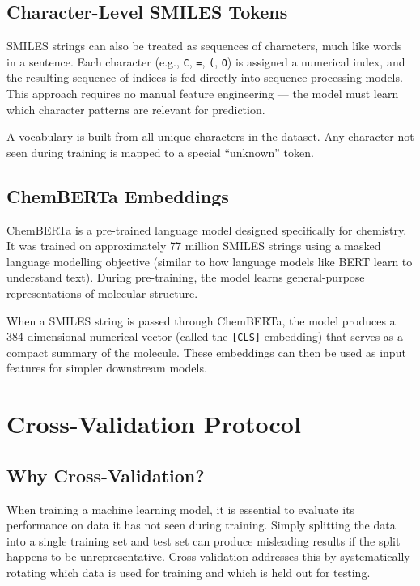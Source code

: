 \documentclass[11pt,a4paper]{article}
\begin{document}
\subsection{Character-Level SMILES Tokens}

SMILES strings can also be treated as sequences of characters, much like words in a sentence. Each character (e.g., \texttt{C}, \texttt{=}, \texttt{(}, \texttt{O}) is assigned a numerical index, and the resulting sequence of indices is fed directly into sequence-processing models. This approach requires no manual feature engineering --- the model must learn which character patterns are relevant for prediction.

A vocabulary is built from all unique characters in the dataset. Any character not seen during training is mapped to a special ``unknown'' token.

\subsection{ChemBERTa Embeddings}

ChemBERTa is a pre-trained language model designed specifically for chemistry. It was trained on approximately 77 million SMILES strings using a masked language modelling objective (similar to how language models like BERT learn to understand text). During pre-training, the model learns general-purpose representations of molecular structure.

When a SMILES string is passed through ChemBERTa, the model produces a 384-dimensional numerical vector (called the \texttt{[CLS]} embedding) that serves as a compact summary of the molecule. These embeddings can then be used as input features for simpler downstream models.

\section{Cross-Validation Protocol}

\subsection{Why Cross-Validation?}

When training a machine learning model, it is essential to evaluate its performance on data it has not seen during training. Simply splitting the data into a single training set and test set can produce misleading results if the split happens to be unrepresentative. Cross-validation addresses this by systematically rotating which data is used for training and which is held out for testing.
\end{document}
